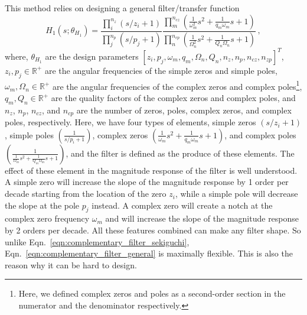 This method relies on designing a general filter/transfer function
\begin{equation}
	H_1(s;\theta_{H_1}) = \frac{\prod_i^{n_z}\left( s/z_i+1\right)}{\prod_j^{n_p} \left(s/p_j+1\right)}\frac{\prod_m^{n_{cz}} \left( \frac{1}{\omega_m^2}s^2 + \frac{1}{q_m \omega_m}s + 1 \right)}{\prod_n^{n_{cp}} \left(\frac{1}{\Omega_n^2}s^2 + \frac{1}{Q_n \Omega_n}s + 1 \right)}\,,
	\label{eqn:complementary_filter_general}
\end{equation}
where, $\theta_{H_1}$ are the design parameters $\left[z_i,p_j,\omega_m,q_m,\Omega_n,Q_n,n_z,n_p,n_{cz},n_{zp}\right]^T$, $z_i,p_j\in\mathbb{R}^+$ are the angular frequencies of the simple zeros and simple poles, $\omega_m,\Omega_n\in\mathbb{R}^+$ are the angular frequencies of the complex zeros and complex poles\footnote{Here, we defined complex zeros and poles as a second-order section in the numerator and the denominator respectively.}, $q_m,Q_n\in\mathbb{R}^+$ are the quality factors of the complex zeros and complex poles, and $n_z$, $n_p$, $n_{cz}$, and $n_{cp}$ are the number of zeros, poles, complex zeros, and complex poles, respectively.
Here, we have four types of elements, simple zeros $(s/z_i+1)$, simple poles $(\frac{1}{s/p_i+1})$, complex zeros $(\frac{1}{\omega_m}s^2+\frac{1}{q_m\omega_m}s+1)$, and complex poles $(\frac{1}{\frac{1}{\Omega_m}s^2+\frac{1}{Q_m\Omega_m}s+1})$, and the filter is defined as the produce of these elements.
The effect of these element in the magnitude response of the filter is well understood.
A simple zero will increase the slope of the magnitude response by 1 order per decade starting from the location of the zero $z_i$, while a simple pole will decrease the slope at the pole $p_j$ instead.
A complex zero will create a notch at the complex zero frequency $\omega_m$ and will increase the slope of the magnitude response by 2 orders per decade.
All these features combined can make any filter shape.
So unlike Eqn.~\eqref{eqn:complementary_filter_sekiguchi}, Eqn.~\eqref{eqn:complementary_filter_general} is maximally flexible.
This is also the reason why it can be hard to design.

